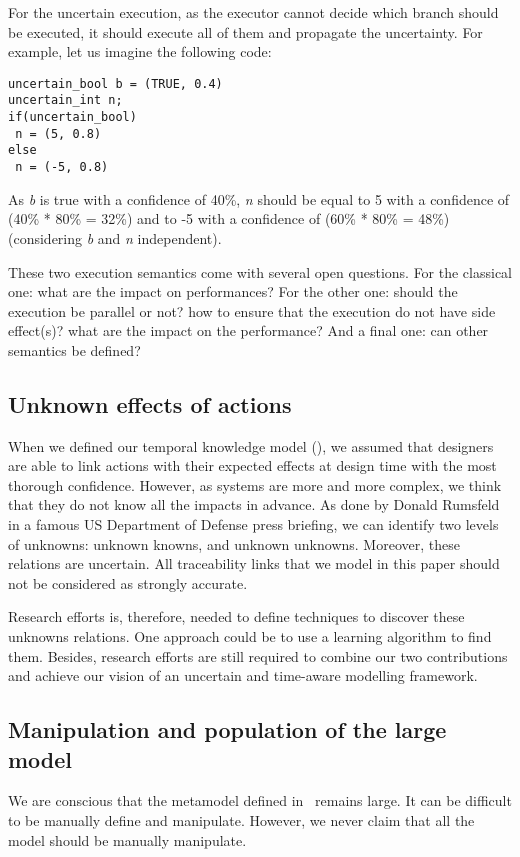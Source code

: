 For the uncertain execution, as the executor cannot decide which branch should be executed, it should execute all of them and propagate the uncertainty.
For example, let us imagine the following code:

\begin{lstlisting}[style=javaStyle, caption=Example for uncertain control flow, label=lst:ucf-bool-example]
uncertain_bool b = (TRUE, 0.4)
uncertain_int n;
if(uncertain_bool)
 n = (5, 0.8)
else
 n = (-5, 0.8)
\end{lstlisting}
As \textit{b} is true with a confidence of 40\%, \textit{n} should be equal to 5 with a confidence of (40\% * 80\% = 32\%) and to -5 with a confidence of (60\% * 80\% = 48\%) (considering \textit{b} and \textit{n} independent).

These two execution semantics come with several open questions.
For the classical one: what are the impact on performances?
For the other one: should the execution be parallel or not? how to ensure that the execution do not have side effect(s)? what are the impact on the performance?
And a final one: can other semantics be defined?

\subsection{Unknown effects of actions}
When we defined our temporal knowledge model (\cf {}), we assumed that designers are able to link \glspl{action} with their expected effects at design time with the most thorough confidence. 
However, as systems are more and more complex, we think that they do not know all the impacts in advance.
As done by Donald Rumsfeld in a famous US Department of Defense press briefing, we can identify two levels of unknowns: unknown knowns, and unknown unknowns.
Moreover, these relations are uncertain.
All traceability links that we model in this paper should not be considered as strongly accurate.

Research efforts is, therefore, needed to define techniques to discover these unknowns relations.
One approach could be to use a learning algorithm to find them.
Besides, research efforts are still required to combine our two contributions and achieve our vision of an uncertain and time-aware modelling framework.

\subsection{Manipulation and population of the large model}
We are conscious that the \gls{metamodel} defined in~ remains large.
It can be difficult to be manually define and manipulate.
However, we never claim that all the model should be manually manipulate.

